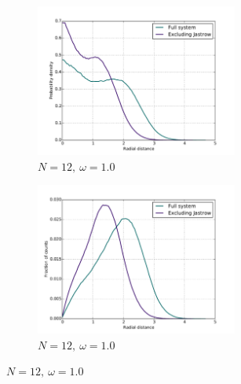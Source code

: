 \documentclass[english, a4paper]{article}
\begin{document}
\begin{figure}[H]
	\vspace{1mm}
	
	\begin{subfigure}{0.5\textwidth}
		\includegraphics[width=\textwidth, height=5cm]{figures/radialDistribution/OneBodyDensityN12w100Se7.pdf}
		\caption{$N=12,\:\omega=1.0$}
	\end{subfigure}
	\begin{subfigure}{0.5\textwidth}
		\includegraphics[width=\textwidth, height= 5cm]{figures/radialDistribution/radialDistributionN12w100Se7.pdf}
		\caption{$N=12,\:\omega=1.0$}
	\end{subfigure}
	
	\vspace{1mm}
	

\end{figure}
\end{document}
